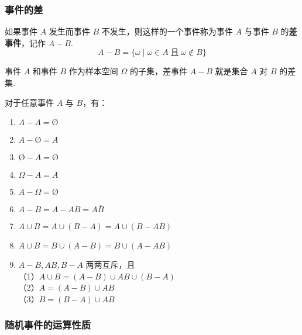 \subsubsection{事件的差}

如果事件 $A$ 发生而事件 $B$ 不发生，则这样的一个事件称为事件 $A$ 与事件 $B$ 的\textbf{差事件}，记作 $A-B$.
$$
A - B = \{ \omega \mid \omega \in A \;\text{且}\; \omega \notin B \}
$$

事件 $A$ 和事件 $B$ 作为样本空间 $\varOmega$ 的子集，差事件 $A - B$ 就是集合 $A$ 对 $B$ 的差集.

\begin{property}
    \indent 对于任意事件 $A$ 与 $B$，有：
    \begin{enumerate}
        \item $A - A = \text{\O}$
        \item $A - \text{\O} = A$
        \item $\text{\O} - A = \text{\O}$
        \item $\varOmega - A = \overline{A}$
        \item $A - \varOmega = \text{\O}$
        \item $A - B = A - AB = A \overline{B}$
        \item $A \cup B = A \cup (B-A) = A \cup (B-AB)$
        \item $A \cup B = B \cup (A-B) = B \cup (A-AB)$
        \item $A-B, AB, B-A$ 两两互斥，且 \\
        （1）$A \cup B = (A-B) \cup AB \cup (B-A)$ \\
        （2）$A = (A-B) \cup AB$ \\
        （3）$B = (B-A) \cup AB$
    \end{enumerate}
\end{property}

\subsubsection{随机事件的运算性质}


